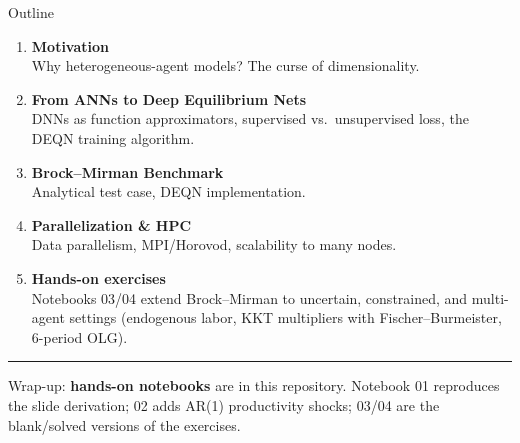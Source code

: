 \documentclass[aspectratio=169,11pt]{beamer}
\begin{document}
\begin{frame}{Outline}
\begin{enumerate}
    \item \textbf{Motivation}\\
    {\small Why heterogeneous-agent models? The curse of dimensionality.}

    \vspace{0.4em}
    \item \textbf{From ANNs to Deep Equilibrium Nets}\\
    {\small DNNs as function approximators, supervised vs.\ unsupervised loss, the DEQN training algorithm.}

    \vspace{0.4em}
    \item \textbf{Brock--Mirman Benchmark}\\
    {\small Analytical test case, DEQN implementation.}

    \vspace{0.4em}
    \item \textbf{Parallelization \& HPC}\\
    {\small Data parallelism, MPI/Horovod, scalability to many nodes.}

    \vspace{0.4em}
    \item \textbf{Hands-on exercises}\\
    {\small Notebooks 03/04 extend Brock--Mirman to uncertain, constrained, and multi-agent settings (endogenous labor, KKT multipliers with Fischer--Burmeister, 6-period OLG).}
\end{enumerate}

\vspace{0.3em}
\hrule
\vspace{0.2em}
{\footnotesize Wrap-up: \textbf{hands-on notebooks} are in this repository.  Notebook 01 reproduces the slide derivation; 02 adds AR(1) productivity shocks; 03/04 are the blank/solved versions of the exercises.}
\end{frame}
\end{document}
